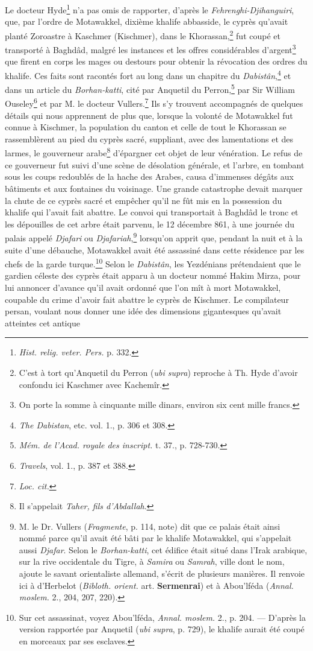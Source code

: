 \documentclass{article}
\begin{document}
Le docteur Hyde\footnote{\emph{Hist. relig. veter. Pers.} p. 332.} n'a pas omis de rapporter, d'après le \emph{Fehrenghi-Djihanguiri}, que, par l'ordre de Motawakkel, dixième khalife abbasside, le cyprès qu'avait planté Zoroastre à Kaschmer (Kischmer), dans le Khorassan,\footnote{C'est à tort qu'Anquetil du Perron (\emph{ubi supra}) reproche à Th. Hyde d'avoir confondu ici Kaschmer avec Kachemîr.} fut coupé et transporté à Baghdâd, malgré les instances et les offres considérables d'argent\footnote{On porte la somme à cinquante mille dinars, environ six cent mille francs.} que firent en corps les mages ou destours pour obtenir la révocation des ordres du khalife. Ces faits sont racontés fort au long dans un chapitre du \emph{Dabistân},\footnote{\emph{The Dabistan}, etc. vol. 1., p. 306 et 308.} et dans un article du \emph{Borhan-katti}, cité par Anquetil du Perron,\footnote{\emph{Mém. de l'Acad. royale des inscript.} t. 37., p. 728-730.} par Sir William Ouseley\footnote{\emph{Travels}, vol. 1., p. 387 et 388.} et par M. le docteur Vullers.\footnote{\emph{Loc. cit.}} Ils s'y trouvent accompagnés de quelques détails qui nous apprennent de plus que, lorsque la volonté de Motawakkel fut connue à Kischmer, la population du canton et celle de tout le Khorassan se rassemblèrent au pied du cyprès sacré, suppliant, avec des lamentations et des larmes, le gouverneur arabe\footnote{Il s'appelait \emph{Taher, fils d'Abdallah}.} d'épargner cet objet de leur vénération. Le refus de ce gouverneur fut suivi d'une scène de désolation générale, et l'arbre, en tombant sous les coups redoublés de la hache des Arabes, causa d'immenses dégâts aux bâtiments et aux fontaines du voisinage. Une grande catastrophe devait marquer la chute de ce cyprès sacré et empêcher qu'il ne fût mis en la possession du khalife qui l'avait fait abattre. Le convoi qui transportait à Baghdâd le tronc et les dépouilles de cet arbre était parvenu, le 12 décembre 861, à une journée du palais appelé \emph{Djafari} ou \emph{Djafariah},\footnote{M. le Dr. Vullers (\emph{Fragmente}, p. 114, note) dit que ce palais était ainsi nommé parce qu'il avait été bâti par le khalife Motawakkel, qui s'appelait aussi \emph{Djafar}. Selon le \emph{Borhan-katti}, cet édifice était situé dans l'Irak arabique, sur la rive occidentale du Tigre, à \emph{Samira} ou \emph{Samrah}, ville dont le nom, ajoute le savant orientaliste allemand, s'écrit de plusieurs manières. Il renvoie ici à d'Herbelot (\emph{Bibloth. orient.} art. \textbf{Sermenrai}) et à Abou'lféda (\emph{Annal. moslem.} 2., 204, 207, 220).} lorsqu'on apprit que, pendant la nuit et à la suite d'une débauche, Motawakkel avait été assassiné dans cette résidence par les chefs de la garde turque.\footnote{Sur cet assassinat, voyez Abou'lféda, \emph{Annal. moslem.} 2., p. 204. --- D'après la version rapportée par Anquetil (\emph{ubi supra}, p. 729), le khalife aurait été coupé en morceaux par ses esclaves.} Selon le \emph{Dabistân}, les Yezdénians prétendaient que le gardien céleste des cyprès était apparu à un docteur nommé Hakim Mirza, pour lui annoncer d'avance qu'il avait ordonné que l'on mît à mort Motawakkel, coupable du crime d'avoir fait abattre le cyprès de Kischmer. Le compilateur persan, voulant nous donner une idée des dimensions gigantesques qu'avait atteintes cet antique 
\end{document}
